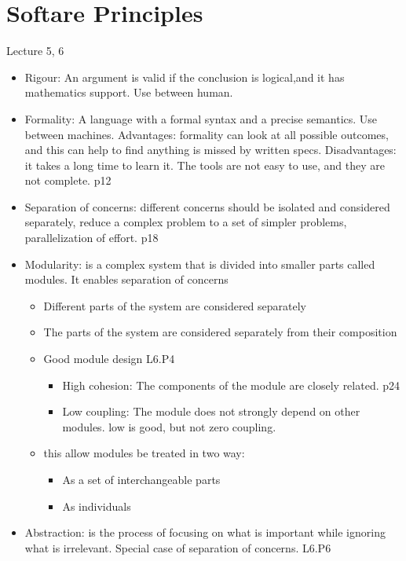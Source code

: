 \documentclass[12pt]{article}
\begin{document}
\section{Softare Principles}
Lecture 5, 6
\begin{itemize}
    \item Rigour: An argument is valid if the conclusion is logical,and it has mathematics support. Use between human.
    \item Formality: A language with a formal syntax and a precise semantics. Use between machines. 
    Advantages: formality can look at all possible outcomes, and this can help to find anything is missed by written specs.
    Disadvantages: it takes a long time to learn it. The tools are not easy to use, and they are not complete. p12
    \item Separation of concerns: different concerns should be isolated and considered separately, 
    reduce a complex problem to a set of simpler problems, parallelization of effort. p18
    \item Modularity: is a complex system that is divided into smaller parts called modules. It enables separation of concerns
    \begin{itemize}
        \item Different parts of the system are considered separately
        \item The parts of the system are considered separately from their composition
        \item Good module design L6.P4
        \begin{itemize}
            \item High cohesion: The components of the module are closely related. p24
            \item Low coupling: The module does not strongly depend on other modules. low is good, but not zero coupling.
        \end{itemize}
        \item this allow modules be treated in two way:
        \begin{itemize}
            \item As a set of interchangeable parts
            \item As individuals
        \end{itemize}
    \end{itemize}
    \item Abstraction: is the process of focusing on what is important while ignoring what is irrelevant. Special case of 
    separation of concerns. L6.P6

\end{itemize}
\end{document}
